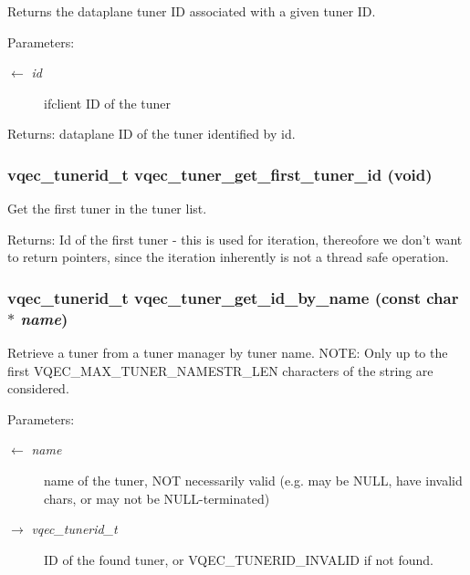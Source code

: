 Returns the dataplane tuner ID associated with a given tuner ID.

\begin{Desc}
\item[Parameters:]
\begin{description}
\item[\mbox{$\leftarrow$} {\em id}]ifclient ID of the tuner \end{description}
\end{Desc}
\begin{Desc}
\item[Returns:]dataplane ID of the tuner identified by id. \end{Desc}
\subsubsection{\setlength{\rightskip}{0pt plus 5cm}vqec\_\-tunerid\_\-t vqec\_\-tuner\_\-get\_\-first\_\-tuner\_\-id (void)}\label{vqec__tuner_8c_8c9f59de01104b59e53b7271798bc422}


Get the first tuner in the tuner list. \begin{Desc}
\item[Returns:]Id of the first tuner - this is used for iteration, thereofore we don't want to return pointers, since the iteration inherently is not a thread safe operation. \end{Desc}
\subsubsection{\setlength{\rightskip}{0pt plus 5cm}vqec\_\-tunerid\_\-t vqec\_\-tuner\_\-get\_\-id\_\-by\_\-name (const char $\ast$ {\em name})}\label{vqec__tuner_8c_8337a18b433b903ddd278633d1b03ff0}


Retrieve a tuner from a tuner manager by tuner name. NOTE: Only up to the first VQEC\_\-MAX\_\-TUNER\_\-NAMESTR\_\-LEN characters of the string are considered.

\begin{Desc}
\item[Parameters:]
\begin{description}
\item[\mbox{$\leftarrow$} {\em name}]name of the tuner, NOT necessarily valid (e.g. may be NULL, have invalid chars, or may not be NULL-terminated) \item[\mbox{$\rightarrow$} {\em vqec\_\-tunerid\_\-t}]ID of the found tuner, or VQEC\_\-TUNERID\_\-INVALID if not found. \end{description}
\end{Desc}
